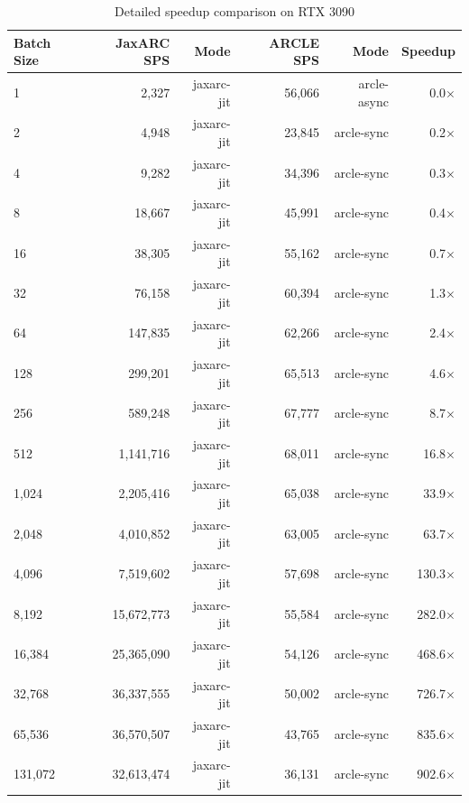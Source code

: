 \begin{table}[htbp]
\centering
\caption{Detailed speedup comparison on RTX 3090}
\label{tab:speedup_rtx_3090}
\small
\begin{tabular}{lrrrrr}
\toprule
Batch Size & JaxARC SPS & Mode & ARCLE SPS & Mode & Speedup \\
\midrule
1 & 2,327 & jaxarc-jit & 56,066 & arcle-async & 0.0$\times$ \\
2 & 4,948 & jaxarc-jit & 23,845 & arcle-sync & 0.2$\times$ \\
4 & 9,282 & jaxarc-jit & 34,396 & arcle-sync & 0.3$\times$ \\
8 & 18,667 & jaxarc-jit & 45,991 & arcle-sync & 0.4$\times$ \\
16 & 38,305 & jaxarc-jit & 55,162 & arcle-sync & 0.7$\times$ \\
32 & 76,158 & jaxarc-jit & 60,394 & arcle-sync & 1.3$\times$ \\
64 & 147,835 & jaxarc-jit & 62,266 & arcle-sync & 2.4$\times$ \\
128 & 299,201 & jaxarc-jit & 65,513 & arcle-sync & 4.6$\times$ \\
256 & 589,248 & jaxarc-jit & 67,777 & arcle-sync & 8.7$\times$ \\
512 & 1,141,716 & jaxarc-jit & 68,011 & arcle-sync & 16.8$\times$ \\
1,024 & 2,205,416 & jaxarc-jit & 65,038 & arcle-sync & 33.9$\times$ \\
2,048 & 4,010,852 & jaxarc-jit & 63,005 & arcle-sync & 63.7$\times$ \\
4,096 & 7,519,602 & jaxarc-jit & 57,698 & arcle-sync & 130.3$\times$ \\
8,192 & 15,672,773 & jaxarc-jit & 55,584 & arcle-sync & 282.0$\times$ \\
16,384 & 25,365,090 & jaxarc-jit & 54,126 & arcle-sync & 468.6$\times$ \\
32,768 & 36,337,555 & jaxarc-jit & 50,002 & arcle-sync & 726.7$\times$ \\
65,536 & 36,570,507 & jaxarc-jit & 43,765 & arcle-sync & 835.6$\times$ \\
131,072 & 32,613,474 & jaxarc-jit & 36,131 & arcle-sync & 902.6$\times$ \\
\bottomrule
\end{tabular}
\end{table}

